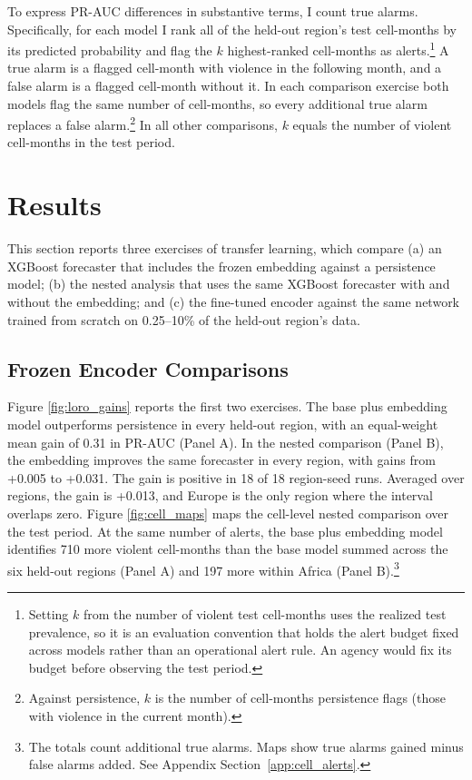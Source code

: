 \documentclass[11pt, letterpaper]{article}
\begin{document}
To express PR-AUC differences in substantive terms, I count true alarms. Specifically, for each model I rank all of the held-out region’s test cell-months by its predicted probability and flag the $k$ highest-ranked cell-months as alerts.\footnote{Setting $k$ from the number of violent test cell-months uses the realized test prevalence, so it is an evaluation convention that holds the alert budget fixed across models rather than an operational alert rule. An agency would fix its budget before observing the test period.} A true alarm is a flagged cell-month with violence in the following month, and a false alarm is a flagged cell-month without it. In each comparison exercise both models flag the same number of cell-months, so every additional true alarm replaces a false alarm.\footnote{Against persistence, $k$ is the number of cell-months persistence flags (those with violence in the current month).} In all other comparisons, $k$ equals the number of violent cell-months in the test period. 

\section{Results}
\label{sec:results}
This section reports three exercises of transfer learning, which compare (a) an XGBoost forecaster that includes the frozen embedding against a persistence model; (b) the nested analysis that uses the same XGBoost forecaster with and without the embedding; and (c) the fine-tuned encoder against the same network trained from scratch on 0.25--10\% of the held-out region's data.

\subsection{Frozen Encoder Comparisons}
Figure \ref{fig:loro_gains} reports the first two exercises. The base plus embedding model outperforms persistence in every held-out region, with an equal-weight mean gain of 0.31 in PR-AUC (Panel A). In the nested comparison (Panel B), the embedding improves the same forecaster in every region, with gains from +0.005 to +0.031. The gain is positive in 18 of 18 region-seed runs. Averaged over regions, the gain is +0.013, and Europe is the only region where the interval overlaps zero. Figure \ref{fig:cell_maps} maps the cell-level nested comparison over the test period. At the same number of alerts, the base plus embedding model identifies 710 more violent cell-months than the base model summed across the six held-out regions (Panel A) and 197 more within Africa (Panel B).\footnote{The totals count additional true alarms. Maps show true alarms gained minus false alarms added. See Appendix Section~\ref{app:cell_alerts}.}
\end{document}
